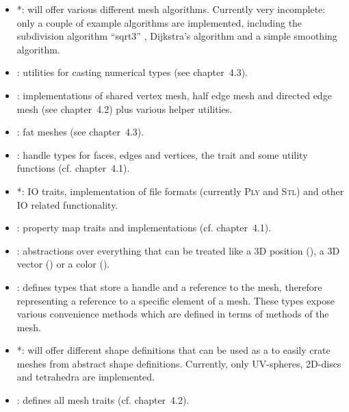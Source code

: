 \begin{itemize}
  \item \textbf{}*: will offer various different mesh algorithms.
  Currently very incomplete: only a couple of example algorithms are implemented, including the subdivision algorithm \enquote{sqrt3} \cite{kobbelt20003}, Dijkstra's algorithm \cite{dijkstra1959note} and a simple smoothing algorithm.
  \item \textbf{}: utilities for casting numerical types (see chapter~4.3).
  \item \textbf{}: implementations of shared vertex mesh, half edge mesh and directed edge mesh (see chapter~4.2) plus various helper utilities.
  \item \textbf{}: fat meshes (see chapter~4.3).
  \item \textbf{}: handle types for faces, edges and vertices, the  trait and some utility functions (cf. chapter~4.1).
  \item \textbf{}*: IO traits, implementation of file formats (currently \textsc{Ply} and \textsc{Stl}) and other IO related functionality.
  \item \textbf{}: property map traits and implementations (cf. chapter~4.1).
  \item \textbf{}: abstractions over everything that can be treated like a 3D position (), a 3D vector () or a color ().
  \item \textbf{}: defines types that store a handle and a reference to the mesh, therefore representing a reference to a specific element of a mesh.
  These types expose various convenience methods which are defined in terms of methods of the mesh.
  \item \textbf{}*: will offer different shape definitions that can be used as a  to easily crate meshes from abstract shape definitions.
  Currently, only UV-spheres, 2D-discs and tetrahedra are implemented.
  \item \textbf{}: defines all mesh traits (cf. chapter~4.2).
\end{itemize}
